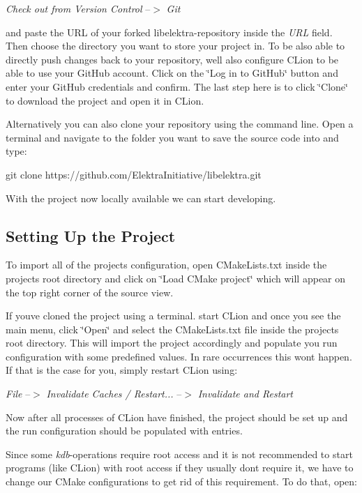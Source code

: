 {\itshape Check out from Version Control} --$>$ {\itshape Git}

and paste the U\+RL of your forked libelektra-\/repository inside the {\itshape U\+RL} field. Then choose the directory you want to store your project in. To be also able to directly push changes back to your repository, we\textquotesingle{}ll also configure C\+Lion to be able to use your Git\+Hub account. Click on the \char`\"{}\+Log in to Git\+Hub\char`\"{} button and enter your Git\+Hub credentials and confirm. The last step here is to click \char`\"{}\+Clone\char`\"{} to download the project and open it in C\+Lion.

Alternatively you can also clone your repository using the command line. Open a terminal and navigate to the folder you want to save the source code into and type\+:


\begin{DoxyCode}
git clone https://github.com/ElektraInitiative/libelektra.git
\end{DoxyCode}


With the project now locally available we can start developing.

\subsection*{Setting Up the Project}

To import all of the project\textquotesingle{}s configuration, open C\+Make\+Lists.\+txt inside the project\textquotesingle{}s root directory and click on \char`\"{}\+Load C\+Make project\char`\"{} which will appear on the top right corner of the source view.

If you\textquotesingle{}ve cloned the project using a terminal. start C\+Lion and once you see the main menu, click \char`\"{}\+Open\char`\"{} and select the C\+Make\+Lists.\+txt file inside the project\textquotesingle{}s root directory. This will import the project accordingly and populate you run configuration with some predefined values. In rare occurrences this won\textquotesingle{}t happen. If that is the case for you, simply restart C\+Lion using\+:

{\itshape File} --$>$ {\itshape Invalidate Caches / Restart...} --$>$ {\itshape Invalidate and Restart}

Now after all processes of C\+Lion have finished, the project should be set up and the run configuration should be populated with entries.

Since some {\itshape kdb}-\/operations require root access and it is not recommended to start programs (like C\+Lion) with root access if they usually don\textquotesingle{}t require it, we have to change our C\+Make configurations to get rid of this requirement. To do that, open\+:

